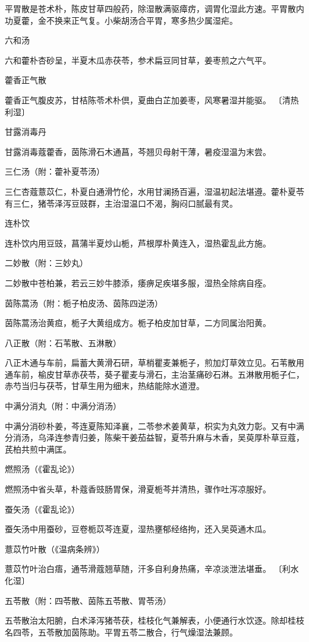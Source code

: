 \documentclass[a4paper,12pt,UTF8,twoside]{ctexbook}
\begin{document}
平胃散是苍术朴，陈皮甘草四般药，除湿散满驱瘴疠，调胃化湿此方速。平胃散内功夏藿，金不换来正气复。小柴胡汤合平胃，寒多热少属湿疟。

六和汤

六和藿朴杏砂呈，半夏木瓜赤茯苓，参术扁豆同甘草，姜枣煎之六气平。

藿香正气散

藿香正气腹皮苏，甘桔陈苓术朴倶，夏曲白芷加姜枣，风寒暑湿并能驱。
〔清热利湿〕

甘露消毒丹

甘露消毒蔻藿香，茵陈滑石木通菖，芩翘贝母射干薄，暑疫湿温为末尝。

三仁汤（附：藿补夏苓汤）

三仁杏蔻薏苡仁，朴夏白通滑竹伦，水用甘澜扬百遍，湿温初起法堪遵。藿朴夏苓有三仁，猪苓泽泻豆豉群，主治湿温口不渴，胸闷口腻最有灵。

连朴饮

连朴饮内用豆豉，菖蒲半夏炒山栀，芦根厚朴黄连入，湿热霍乱此方施。

二妙散（附：三妙丸）

二妙散中苍柏兼，若云三妙牛膝添，痿痹足疾堪多服，湿热全除病自痊。

茵陈蒿汤（附：栀子柏皮汤、茵陈四逆汤）

茵陈蒿汤治黄疸，栀子大黄组成方。栀子柏皮加甘草，二方同属治阳黄。

八正散（附：石苇散、五淋散）

八正木通与车前，扁蓄大黄滑石研，草梢瞿麦兼栀子，煎加灯草效立见。石苇散用通车前，榆皮甘草赤茯苓，葵子瞿麦与滑石，主治茎痛砂石淋。五淋散用栀子仁，赤芍当归与茯苓，甘草生用为细末，热结能除水道澄。

中满分消丸（附：中满分消汤）

中满分消砂朴姜，芩连夏陈知泽襄，二苓参术姜黄草，枳实为丸效力彰。又有中满分消汤，乌泽连参青归姜，陈柴干姜茄益智，夏苓升麻与木香，吴萸厚朴草豆蔻，芪柏共煎中满匡。

燃照汤（《霍乱论》）

燃照汤中省头草，朴蔻香豉肠胃保，滑夏栀芩并清热，骤作吐泻凉服好。

蚕矢汤（《霍乱论》）

蚕矢汤中用蚕砂，豆卷栀苡芩连夏，湿热壅郁经络拘，还入吴萸通木瓜。

薏苡竹叶散（《温病条辨》）

薏苡竹叶治白痦，通苓滑蔻翘草随，汗多自利身热痛，辛凉淡泄法堪垂。
〔利水化湿〕

五苓散（附：四苓散、茵陈五苓散、胃苓汤）

五苓散治太阳腑，白术泽泻猪苓茯，桂枝化气兼解表，小便通行水饮逐。除却桂枝名四苓，五苓散加茵陈助。平胃五苓二散合，行气燥湿法兼顾。
\end{document}
